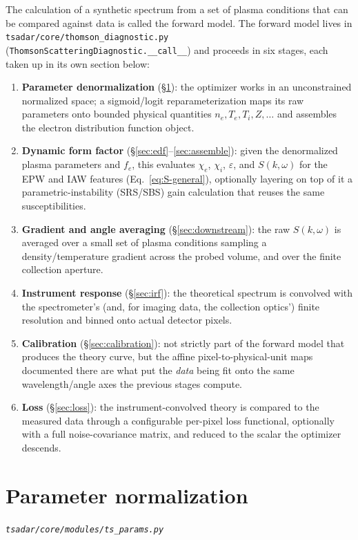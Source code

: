 \documentclass[11pt]{article}
\newcommand{\code}[1]{\texttt{#1}}
\newcommand{\file}[1]{\texttt{#1}}
\begin{document}
The calculation of a synthetic spectrum from a set of plasma conditions that can be compared against data is called the forward model. The forward model lives in \file{tsadar/core/thomson\_diagnostic.py}
(\code{ThomsonScatteringDiagnostic.\_\_call\_\_}) and proceeds in six stages, each taken
up in its own section below:
\begin{enumerate}
  \item \textbf{Parameter denormalization} (\S\ref{sec:paramnorm}): the optimizer works in
    an unconstrained normalized space; a sigmoid/logit reparameterization maps its raw
    parameters onto bounded physical quantities $n_e,T_e,T_i,Z,\ldots$ and assembles the
    electron distribution function object.
  \item \textbf{Dynamic form factor} (\S\ref{sec:edf}--\ref{sec:assemble}): given the
    denormalized plasma parameters and $f_e$, this evaluates $\chi_e$, $\chi_i$,
    $\varepsilon$, and $S(k,\omega)$ for the EPW and IAW features (Eq.~\ref{eq:S-general}),
    optionally layering on top of it a parametric-instability (SRS/SBS) gain calculation
    that reuses the same susceptibilities.
  \item \textbf{Gradient and angle averaging} (\S\ref{sec:downstream}): the raw $S(k,\omega)$
    is averaged over a small set of plasma conditions sampling a density/temperature
    gradient across the probed volume, and over the finite collection aperture.
  \item \textbf{Instrument response} (\S\ref{sec:irf}): the theoretical spectrum is
    convolved with the spectrometer's (and, for imaging data, the collection optics')
    finite resolution and binned onto actual detector pixels.
  \item \textbf{Calibration} (\S\ref{sec:calibration}): not strictly part of the forward
    model that produces the theory curve, but the affine pixel-to-physical-unit maps
    documented there are what put the \emph{data} being fit onto the same wavelength/angle
    axes the previous stages compute.
  \item \textbf{Loss} (\S\ref{sec:loss}): the instrument-convolved theory is compared to
    the measured data through a configurable per-pixel loss functional, optionally with a
    full noise-covariance matrix, and reduced to the scalar the optimizer descends.
\end{enumerate}

\section{Parameter normalization}\label{sec:paramnorm}
\textit{\file{tsadar/core/modules/ts\_params.py}}
\end{document}
